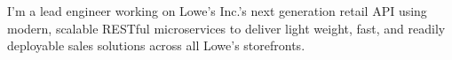 

\begin{cvparagraph}




I'm a lead engineer working on Lowe's Inc.'s next generation retail API using modern, scalable RESTful microservices to deliver light weight, fast, and readily deployable sales solutions across all Lowe's storefronts. 



\end{cvparagraph}
